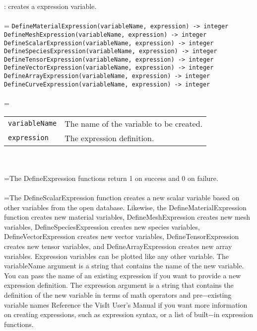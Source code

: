 \documentclass[10pt,a4paper]{report}
\begin{document}
{}
: creates a expression variable.\\[-3mm]

 \\ 
\hangindent=\parindent 
\verb!DefineMaterialExpression(variableName, expression) -> integer!\\ 
\verb!DefineMeshExpression(variableName, expression) -> integer!\\ 
\verb!DefineScalarExpression(variableName, expression) -> integer!\\ 
\verb!DefineSpeciesExpression(variableName, expression) -> integer!\\ 
\verb!DefineTensorExpression(variableName, expression) -> integer!\\ 
\verb!DefineVectorExpression(variableName, expression) -> integer!\\ 
\verb!DefineArrayExpression(variableName, expression) -> integer!\\ 
\verb!DefineCurveExpression(variableName, expression) -> integer!\\ [-3mm]

 \\ 
\hangindent=\parindent 
\begin{tabular}{ll}
\verb!variableName! & The name of the variable to be created. \\
\verb!expression! & The expression definition. \\
\end{tabular} \\[-2mm]


 \\ 
\hangindent=\parindent The DefineExpression functions return 1 on success and 0 on failure. \\[-3mm] 

 \\ 
\hangindent=\parindent The DefineScalarExpression function creates a new scalar variable based on other variables from the open database. Likewise, the DefineMaterialExpression function creates new material variables, DefineMeshExpression creates new mesh variables, DefineSpeciesExpression creates new species variables, DefineVectorExpression creates new vector variables, DefineTensorExpression creates new tensor variables, and DefineArrayExpression creates new array variables. Expression variables can be plotted like any other variable. The variableName argument is a string that contains the name of the new variable. You can pass the name of an existing expression if you want to provide a new expression definition. The expression argument is a string that contains the definition of the new variable in terms of math operators and pre$-$existing variable names Reference the VisIt User's Manual if you want more information on  creating expressions, such as expression syntax, or a list of built$-$in expression functions. \\[-3mm] 
\end{document}
